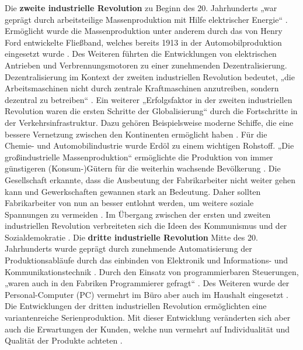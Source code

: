 \newline\newline
Die \textbf{zweite industrielle Revolution} zu Beginn des 20. Jahrhunderts „war geprägt durch arbeitsteilige Massenproduktion mit Hilfe elektrischer Energie“ \cite[S.5]{15}. Ermöglicht wurde die Massenproduktion unter anderem durch das von Henry Ford entwickelte Fließband, welches bereits 1913 in der Automobilproduktion eingesetzt wurde \cite{10}. Des Weiteren führten die Entwicklungen von elektrischen Antrieben und Verbrennungsmotoren zu einer zunehmenden Dezentralisierung. Dezentralisierung im Kontext der zweiten industriellen Revolution bedeutet, „die Arbeitsmaschinen nicht durch zentrale Kraftmaschinen anzutreiben, sondern dezentral zu betreiben“ \cite[S.6]{15}. Ein weiterer „Erfolgsfaktor in der zweiten industriellen Revolution waren die ersten Schritte der Globalisierung“ \cite{9} durch die Fortschritte in der Verkehrsinfrastruktur. Dazu gehören Beispielsweise moderne Schiffe, die eine bessere Vernetzung zwischen den Kontinenten ermöglicht haben \cite{9}. Für die Chemie- und Automobilindustrie wurde Erdöl zu einem wichtigen Rohstoff. „Die großindustrielle Massenproduktion“ \cite[S.6]{15} ermöglichte die Produktion von immer günstigeren (Konsum-)Gütern für die weiterhin wachsende Bevölkerung \cite[S.6]{15}. Die Gesellschaft erkannte, dass die Ausbeutung der Fabrikarbeiter nicht weiter gehen kann und Gewerkschaften gewannen stark an Bedeutung. Daher sollten Fabrikarbeiter von nun an besser entlohnt werden, um weitere soziale Spannungen zu vermeiden \cite[S.6]{15}. Im Übergang zwischen der ersten und zweiten industriellen Revolution verbreiteten sich die Ideen des Kommunismus und der Sozialdemokratie \cite[S.6]{15}.
\newline\newline
Die \textbf{dritte industrielle Revolution} Mitte des 20. Jahrhunderts wurde geprägt durch zunehmende Automatisierung der Produktionsabläufe durch das einbinden von Elektronik und Informations- und Kommunikationstechnik \cite[S.7]{15}. Durch den Einsatz von programmierbaren Steuerungen, „waren auch in den Fabriken Programmierer gefragt“ \cite{10}. Des Weiteren wurde der Personal-Computer (PC) vermehrt im Büro aber auch im Haushalt eingesetzt \cite{9}. Die Entwicklungen der dritten industriellen Revolution ermöglichten eine variantenreiche Serienproduktion. Mit dieser Entwicklung veränderten sich aber auch die Erwartungen der Kunden, welche nun vermehrt auf Individualität und Qualität der Produkte achteten \cite[S.7]{15}.
\newline\newline
